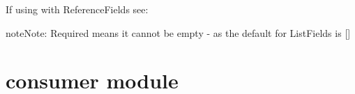\documentclass[letterpaper,10pt,english]{sphinxmanual}
\begin{document}
\begin{fulllineitems}
\begin{fulllineitems}
If using with ReferenceFields see: 

\begin{sphinxadmonition}{note}{Note:}
Required means it cannot be empty - as the default for ListFields is {[}{]}
\end{sphinxadmonition}

\end{fulllineitems}


\begin{fulllineitems}
\label{\detokenize{concept_map:concept_map.ConceptMap.objects}}
\end{fulllineitems}


\end{fulllineitems}



\chapter{consumer module}
\label{\detokenize{consumer:module-consumer}}\label{\detokenize{consumer::doc}}\label{\detokenize{consumer:consumer-module}}
\end{document}
